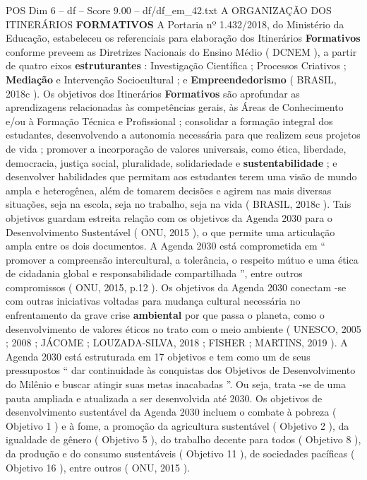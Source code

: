 \begin{textsample}{POS Dim 6 – df – Score 9.00 – df/df\_em\_42.txt}  \label{ex:f6_pos_125}
A ORGANIZAÇÃO DOS ITINERÁRIOS \textbf{FORMATIVOS} A Portaria nº 1.432/2018, do Ministério da Educação, estabeleceu os referenciais para elaboração dos Itinerários \textbf{Formativos} conforme preveem as Diretrizes Nacionais do Ensino Médio ( DCNEM ), a partir de quatro eixos \textbf{estruturantes} : Investigação Científica ; Processos Criativos ; \textbf{Mediação} e Intervenção Sociocultural ; e \textbf{Empreendedorismo} ( BRASIL, 2018c ).
Os objetivos dos Itinerários \textbf{Formativos} são aprofundar as aprendizagens relacionadas às competências gerais, às Áreas de Conhecimento e/ou à Formação Técnica e Profissional ; consolidar a formação integral dos estudantes, desenvolvendo a autonomia necessária para que realizem seus projetos de vida ; promover a incorporação de valores universais, como ética, liberdade, democracia, justiça social, pluralidade, solidariedade e \textbf{sustentabilidade} ; e desenvolver habilidades que permitam aos estudantes terem uma visão de mundo ampla e heterogênea, além de tomarem decisões e agirem nas mais diversas situações, seja na escola, seja no trabalho, seja na vida ( BRASIL, 2018c ).
Tais objetivos guardam estreita relação com os objetivos da Agenda 2030 para o Desenvolvimento Sustentável ( ONU, 2015 ), o que permite uma articulação ampla entre os dois documentos.
A Agenda 2030 está comprometida em “ promover a compreensão intercultural, a tolerância, o respeito mútuo e uma ética de cidadania global e responsabilidade compartilhada ”, entre outros compromissos ( ONU, 2015, p.12 ).
Os objetivos da Agenda 2030 conectam -se com outras iniciativas voltadas para mudança cultural necessária no enfrentamento da grave crise \textbf{ambiental} por que passa o planeta, como o desenvolvimento de valores éticos no trato com o meio ambiente ( UNESCO, 2005 ; 2008 ; JÁCOME ; LOUZADA-SILVA, 2018 ; FISHER ; MARTINS, 2019 ).
A Agenda 2030 está estruturada em 17 objetivos e tem como um de seus pressupostos “ dar continuidade às conquistas dos Objetivos de Desenvolvimento do Milênio e buscar atingir suas metas inacabadas ”.
Ou seja, trata -se de uma pauta ampliada e atualizada a ser desenvolvida até 2030.
Os objetivos de desenvolvimento sustentável da Agenda 2030 incluem o combate à pobreza ( Objetivo 1 ) e à fome, a promoção da agricultura sustentável ( Objetivo 2 ), da igualdade de gênero ( Objetivo 5 ), do trabalho decente para todos ( Objetivo 8 ), da produção e do consumo sustentáveis ( Objetivo 11 ), de sociedades pacíficas ( Objetivo 16 ), entre outros ( ONU, 2015 ).

\end{textsample}
